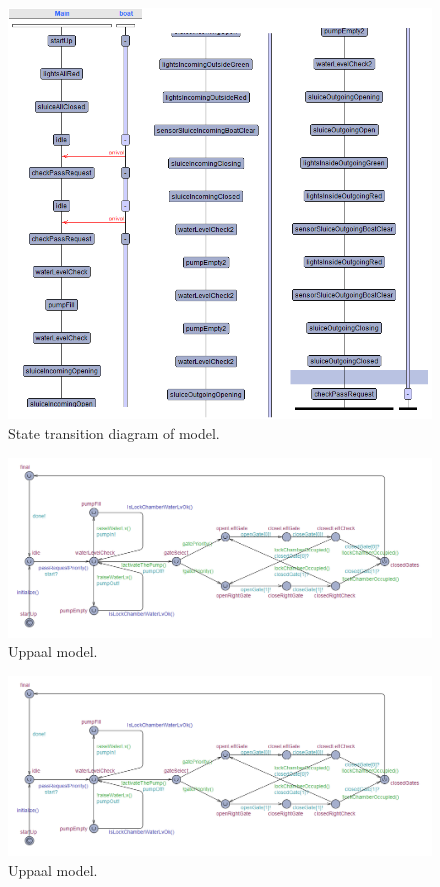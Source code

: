 \documentclass{article}
\begin{document}
\begin{figure}[!h]
	\centering
	\includegraphics[width=\textwidth]{images/State_diagram2.png}
    \caption{State transition diagram of model.}
\end{figure}
\newpage
\begin{figure}[!h]
	\centering
	\includegraphics[width=\textwidth]{images/uppaal_model_final.png}
    \caption{Uppaal model.}
    \label{fig:uppaalmodel}
\end{figure}
\newpage
\begin{figure}
	\centering
	\includegraphics[width=\textwidth]{images/uppaal_model_final.png}
    \caption{Uppaal model.}
    \label{fig:uppaalmodelsideways}
\end{figure}
\clearpage
\newpage



\end{document}
